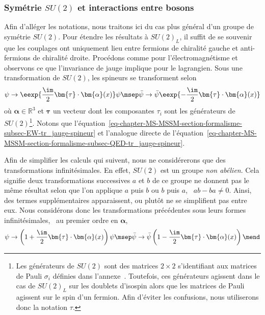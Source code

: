 \subsubsection{Symétrie $SU(2)$ et interactions entre bosons}\label{chapter-MS-MSSM-section-formalisme-subsec-EW-SU2_general}
Afin d'alléger les notations, nous traitons ici du cas plus général d'un groupe de symétrie $SU(2)$. Pour étendre les résultats à $SU(2)_L$, il suffit de se souvenir que les couplages ont uniquement lieu entre fermions de chiralité gauche et anti-fermions de chiralité droite.
Procédons comme pour l'électromagnétisme et observons ce que l'invariance de jauge implique pour le lagrangien. Sous une transformation de $SU(2)$, les spineurs se transforment selon
\begin{equation}
\psi \to \eexp{\frac{\im}{2}\bm{\tau}\cdot\bm{\alpha}(x)}\psi
\msep
\bar{\psi} \to \bar{\psi}\eexp{-\frac{\im}{2}\bm{\tau}\cdot\bm{\alpha}(x)}
\label{eq-chapter-MS-MSSM-section-formalisme-subsec-EW-tr_jauge-spineur}
\end{equation}
où $\bm{\alpha}\in\mathbb{R}^3$ et $\bm{\tau}$ un vecteur dont les composantes $\tau_i$ sont les générateurs de $SU(2)$\footnote{Les générateurs de $SU(2)$ sont des matrices $2\times2$ s'identifiant aux matrices de Pauli $\sigma_i$ définies dans l'annexe~. Toutefois, ces générateurs agissent dans le cas de $SU(2)_L$ sur les doublets d'isospin alors que les matrices de Pauli agissent sur le spin d'un fermion. Afin d'éviter les confusions, nous utiliserons donc la notation $\tau$.}.
Notons que l'équation~\eqref{eq-chapter-MS-MSSM-section-formalisme-subsec-EW-tr_jauge-spineur} et l'analogue directe de l'équation~\eqref{eq-chapter-MS-MSSM-section-formalisme-subsec-QED-tr_jauge-spineur}.
\par Afin de simplifier les calculs qui suivent, nous ne considérerons que des transformations infinitésimales. En effet, $SU(2)$ est un groupe \emph{non abélien}. Cela signifie deux transformations successives $a$ et $b$ de ce groupe ne donnent pas le même résultat selon que l'on applique $a$ puis $b$ ou $b$ puis $a$, \ie\ $ab-ba\neq0$. Ainsi, des termes supplémentaires apparaissent, ou plutôt ne se simplifient pas entre eux. Nous considérons donc les transformations précédentes sous leurs formes infinitésimales, \ie\ au premier ordre en $\bm{\alpha}$,
\begin{equation}
\psi \to \left(1+\frac{\im}{2}\bm{\tau}\cdot\bm{\alpha}(x)\right)\psi
\msep
\bar{\psi} \to \bar{\psi}\left(1-\frac{\im}{2}\bm{\tau}\cdot\bm{\alpha}(x)\right)
\mend
\end{equation}
